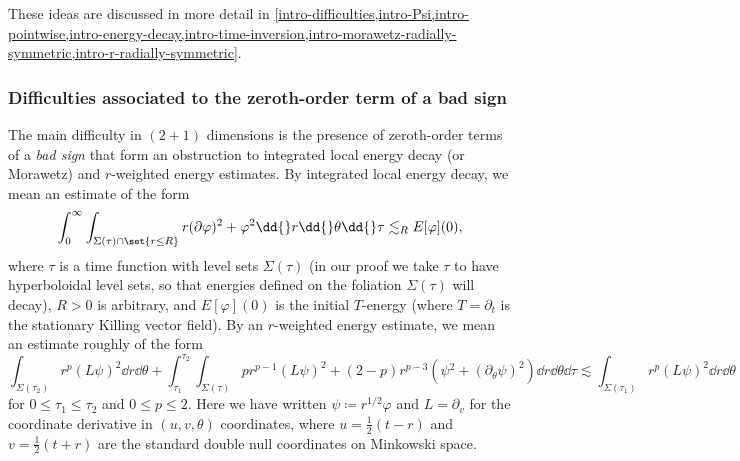 \documentclass[10pt, reqno]{amsart}
\begin{document}
These ideas are discussed in more detail in
\cref{intro-difficulties,intro-Psi,intro-pointwise,intro-energy-decay,intro-time-inversion,intro-morawetz-radially-symmetric,intro-r-radially-symmetric}.
\subsubsection{Difficulties associated to the zeroth-order term of a bad sign}
\label{intro-difficulties}
The main difficulty in \((2 + 1)\) dimensions is the presence of zeroth-order
terms of a \emph{bad sign} that form an obstruction to integrated local energy decay
(or Morawetz) and \(r\)-weighted energy estimates. By integrated local energy
decay, we mean an estimate of the form
\begin{equation}\label{intro-morawetz}
\int_0^\infty \int _{\Sigma{}(\tau{})\cap \set{r\le R}} r(\partial{}\varphi{})^2 + \varphi^2\dd{}r\dd{}\theta{}\dd{}\tau{} \lesssim _R E[\varphi{}](0),
\end{equation}
where \(\tau{}\) is a time function with level sets \(\Sigma{}(\tau{})\) (in our proof we take
\(\tau{}\) to have hyperboloidal level sets, so that energies defined on the
foliation \(\Sigma{}(\tau{})\) will decay), \(R > 0\) is arbitrary, and
\(E[\varphi{}](0)\) is the initial \(T\)-energy (where \(T = \partial_t\) is the
stationary Killing vector field). By an \(r\)-weighted energy estimate, we mean
an estimate roughly of the form
\begin{equation}
\int _{\Sigma{}(\tau{}_2)} r^p(L\psi{})^2\dd{}r\dd{}\theta{} + \int_{\tau{}_1}^{\tau{}_2} \int _{\Sigma{}(\tau{})} pr^{p-1}(L\psi{})^2 + (2-p)r^{p-3}(\psi{}^2 + (\partial{}_\theta{}\psi{})^2)\dd{}r\dd{}\theta{}\dd{}\tau{}\lesssim \int _{\Sigma{}(\tau{}_1)} r^p(L\psi{})^2\dd{}r\dd{}\theta{}
\end{equation}
for \(0\le \tau_1\le \tau_2\) and \(0\le p\le 2\). Here we have written \(\psi{} \coloneqq{}r^{1/2}\varphi{}\) and
\(L=\partial_v\) for the coordinate derivative in \((u,v,\theta{})\)
coordinates, where \(u = \frac{1}{2}(t - r)\) and \(v = \frac{1}{2}(t + r)\) are
the standard double null coordinates on Minkowski space.
\end{document}
